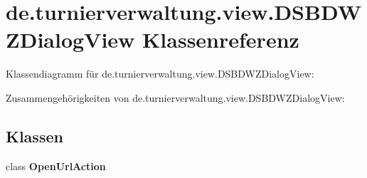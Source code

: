 \hypertarget{classde_1_1turnierverwaltung_1_1view_1_1_d_s_b_d_w_z_dialog_view}{}\section{de.\+turnierverwaltung.\+view.\+D\+S\+B\+D\+W\+Z\+Dialog\+View Klassenreferenz}
\label{classde_1_1turnierverwaltung_1_1view_1_1_d_s_b_d_w_z_dialog_view}


Klassendiagramm für de.\+turnierverwaltung.\+view.\+D\+S\+B\+D\+W\+Z\+Dialog\+View\+:


Zusammengehörigkeiten von de.\+turnierverwaltung.\+view.\+D\+S\+B\+D\+W\+Z\+Dialog\+View\+:
\subsection*{Klassen}
\begin{DoxyCompactItemize}
\item 
class {\bfseries Open\+Url\+Action}
\end{DoxyCompactItemize}

